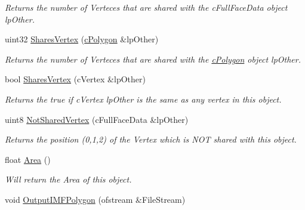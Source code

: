 \begin{DoxyCompactItemize}
\begin{DoxyCompactList}\small\item\em Returns the number of Verteces that are shared with the cFullFaceData object lpOther. \end{DoxyCompactList}\item 
\hypertarget{classc_polygon_a1593da884bcb8f734c53bc92fb387291}{
uint32 \hyperlink{classc_polygon_a1593da884bcb8f734c53bc92fb387291}{SharesVertex} (\hyperlink{classc_polygon}{cPolygon} \&lpOther)}
\label{classc_polygon_a1593da884bcb8f734c53bc92fb387291}

\begin{DoxyCompactList}\small\item\em Returns the number of Verteces that are shared with the \hyperlink{classc_polygon}{cPolygon} object lpOther. \end{DoxyCompactList}\item 
\hypertarget{classc_polygon_a0e886ad06cb8f49ae903e5456a54be4a}{
bool \hyperlink{classc_polygon_a0e886ad06cb8f49ae903e5456a54be4a}{SharesVertex} (cVertex \&lpOther)}
\label{classc_polygon_a0e886ad06cb8f49ae903e5456a54be4a}

\begin{DoxyCompactList}\small\item\em Returns the true if cVertex lpOther is the same as any vertex in this object. \end{DoxyCompactList}\item 
\hypertarget{classc_polygon_a1a034ce510c2bbe6c9de1a4999c6efc1}{
uint8 \hyperlink{classc_polygon_a1a034ce510c2bbe6c9de1a4999c6efc1}{NotSharedVertex} (cFullFaceData \&lpOther)}
\label{classc_polygon_a1a034ce510c2bbe6c9de1a4999c6efc1}

\begin{DoxyCompactList}\small\item\em Returns the position (0,1,2) of the Vertex which is NOT shared with this object. \end{DoxyCompactList}\item 
\hypertarget{classc_polygon_a4ef25bebffda1b61ea7f373432d9de4c}{
float \hyperlink{classc_polygon_a4ef25bebffda1b61ea7f373432d9de4c}{Area} ()}
\label{classc_polygon_a4ef25bebffda1b61ea7f373432d9de4c}

\begin{DoxyCompactList}\small\item\em Will return the Area of this object. \end{DoxyCompactList}\item 
\hypertarget{classc_polygon_a7670adccfeb0f099d6d2dd87f44ed68a}{
void \hyperlink{classc_polygon_a7670adccfeb0f099d6d2dd87f44ed68a}{OutputIMFPolygon} (ofstream \&FileStream)}
\label{classc_polygon_a7670adccfeb0f099d6d2dd87f44ed68a}


\end{DoxyCompactItemize}
